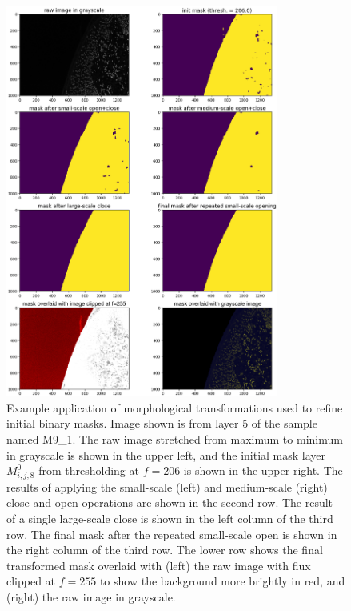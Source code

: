\documentclass[letterpaper,11pt]{article}
\begin{document}
\begin{figure}[!ht]
\centering
\includegraphics[width=0.80\textwidth]{images/masking/image_9941_layer_5_masks}
\caption{\footnotesize Example application of morphological transformations used to refine initial binary masks. Image shown is from layer 5 of the sample named M9\_1. The raw image stretched from maximum to minimum in grayscale is shown in the upper left, and the initial mask layer $M^{0}_{i,j,8}$ from thresholding at $f=206$ is shown in the upper right. The results of applying the small-scale (left) and medium-scale (right) close and open operations are shown in the second row. The result of a single large-scale close is shown in the left column of the third row. The final mask after the repeated small-scale open is shown in the right column of the third row. The lower row shows the final transformed mask overlaid with (left) the raw image with flux clipped at $f=255$ to show the background more brightly in red, and (right) the raw image in grayscale.}
\label{fig:mask_example_max}
\end{figure}

\clearpage

\end{document}
